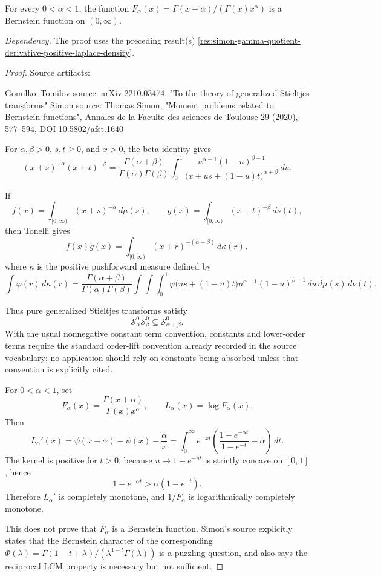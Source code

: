 \begin{proposition}
\label{res:simon-gamma-quotient-bf-alpha-window-open-problem}
For every \(0<\alpha<1\), the function \(F_\alpha(x)=\Gamma(x+\alpha)/(\Gamma(x)x^\alpha)\) is a Bernstein function on \((0,\infty)\).

\emph{Dependency.} The proof uses the preceding result(s) \ref{res:simon-gamma-quotient-derivative-positive-laplace-density}.
\end{proposition}
\begin{proof}
Source artifacts:

Gomilko--Tomilov source: arXiv:2210.03474, "To the theory of generalized Stieltjes transforms"
Simon source: Thomas Simon, "Moment problems related to Bernstein functions", Annales de la Faculte des sciences de Toulouse 29 (2020), 577--594, DOI 10.5802/afst.1640

For \(\alpha,\beta>0\), \(s,t\ge0\), and \(x>0\), the beta identity gives
\[
(x+s)^{-\alpha}(x+t)^{-\beta}
=
\frac{\Gamma(\alpha+\beta)}{\Gamma(\alpha)\Gamma(\beta)}
\int_0^1
\frac{u^{\alpha-1}(1-u)^{\beta-1}}
{\bigl(x+us+(1-u)t\bigr)^{\alpha+\beta}}
\,du.
\]

If
\[
f(x)=\int_{[0,\infty)}(x+s)^{-\alpha}\,d\mu(s),
\qquad
g(x)=\int_{[0,\infty)}(x+t)^{-\beta}\,d\nu(t),
\]
then Tonelli gives
\[
f(x)g(x)=\int_{[0,\infty)}(x+r)^{-(\alpha+\beta)}\,d\kappa(r),
\]
where \(\kappa\) is the positive pushforward measure defined by
\[
\int \varphi(r)\,d\kappa(r)
=
\frac{\Gamma(\alpha+\beta)}{\Gamma(\alpha)\Gamma(\beta)}
\int\!\!\int\!\!\int_0^1
\varphi\bigl(us+(1-u)t\bigr)
u^{\alpha-1}(1-u)^{\beta-1}
\,du\,d\mu(s)\,d\nu(t).
\]

Thus pure generalized Stieltjes transforms satisfy
\[
\mathcal S_\alpha^{0}\mathcal S_\beta^{0}\subseteq \mathcal S_{\alpha+\beta}^{0}.
\]
With the usual nonnegative constant term convention, constants and lower-order terms require the standard order-lift convention already recorded in the source vocabulary; no application should rely on constants being absorbed unless that convention is explicitly cited.

For \(0<\alpha<1\), set
\[
F_\alpha(x)=\frac{\Gamma(x+\alpha)}{\Gamma(x)x^\alpha},
\qquad
L_\alpha(x)=\log F_\alpha(x).
\]
Then
\[
L_\alpha'(x)
=
\psi(x+\alpha)-\psi(x)-\frac{\alpha}{x}
=
\int_0^\infty e^{-xt}
\left(
\frac{1-e^{-\alpha t}}{1-e^{-t}}-\alpha
\right)\,dt.
\]
The kernel is positive for \(t>0\), because \(u\mapsto 1-e^{-ut}\) is strictly concave on \([0,1]\), hence
\[
1-e^{-\alpha t}>\alpha(1-e^{-t}).
\]
Therefore \(L_\alpha'\) is completely monotone, and \(1/F_\alpha\) is logarithmically completely monotone.

This does not prove that \(F_\alpha\) is a Bernstein function. Simon's source explicitly states that the Bernstein character of the corresponding \(\Phi(\lambda)=\Gamma(1-t+\lambda)/(\lambda^{1-t}\Gamma(\lambda))\) is a puzzling question, and also says the reciprocal LCM property is necessary but not sufficient.
\end{proof}

